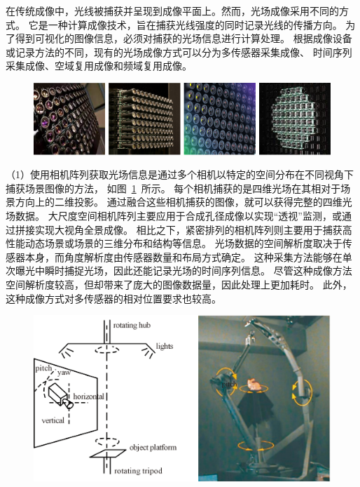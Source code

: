 在传统成像中，光线被捕获并呈现到成像平面上。然而，光场成像采用不同的方式。
它是一种计算成像技术，旨在捕获光线强度的同时记录光线的传播方向。
为了得到可视化的图像信息，必须对捕获的光场信息进行计算处理。
根据成像设备或记录方法的不同，现有的光场成像方式可以分为多传感器采集成像、
时间序列采集成像、空域复用成像和频域复用成像。\par
%
%
%
%
\begin{figure}[!ht]
	\centering
	\includegraphics[width=1\linewidth]{figures/chapter2/camera_array}
	\label{chapter2_fig2:camera_array}
\end{figure}
%
%
%
%
（1）使用相机阵列获取光场信息是通过多个相机以特定的空间分布在不同视角下捕获场景图像的方法，
如图~\ref{chapter2_fig2:camera_array}~所示。
每个相机捕获的是四维光场在其相对于场景方向上的二维投影。
通过融合这些相机捕获的图像，就可以获得完整的四维光场数据。
大尺度空间相机阵列主要应用于合成孔径成像以实现“透视”监测，或通过拼接实现大视角全景成像。
相比之下，紧密排列的相机阵列则主要用于捕获高性能动态场景或场景的三维分布和结构等信息。
光场数据的空间解析度取决于传感器本身，而角度解析度由传感器数量和布局方式确定。
这种采集方法能够在单次曝光中瞬时捕捉光场，因此还能记录光场的时间序列信息。
尽管这种成像方法空间解析度较高，但却带来了庞大的图像数据量，因此处理上更加耗时。
此外，这种成像方式对多传感器的相对位置要求也较高。\par
%
%
%
%
\begin{figure}[!ht]
	\centering
	\includegraphics[width=0.7\linewidth]{figures/chapter2/time_seq2}
	\label{chapter2_fig3:time_seq2}
\end{figure}
